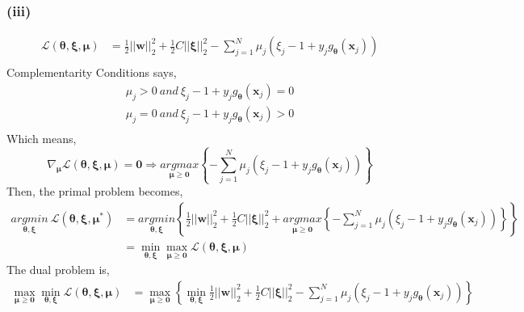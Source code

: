 \documentclass[11pt]{article}
\begin{document}
\subsubsection*{(iii)}
\begin{equation}
\begin{split}
\mathcal{L}(\pmb{\theta}, \pmb{\xi}, \pmb{\mu}) &= \frac{1}{2}||\pmb{w}||^2_2 + \frac{1}{2}C||\pmb{\xi}||^2_2 - \sum_{j=1}^{N}\mu_j(\xi_j-1+y_jg_{\pmb{\theta}}(\pmb{x}_j))\\
\end{split}
\end{equation}
Complementarity Conditions says,
\begin{equation}
\begin{split}
\mu_j > 0\ and\ \xi_j-1+y_jg_{\pmb{\theta}}(\pmb{x}_j) = 0\\
\mu_j = 0\ and\ \xi_j-1+y_jg_{\pmb{\theta}}(\pmb{x}_j) > 0\\
\end{split}
\end{equation} 
Which means,
\begin{equation}
\nabla_{\pmb{\mu}}\mathcal{L}(\pmb{\theta}, \pmb{\xi}, \pmb{\mu})=\pmb{0} \Rightarrow \underset{\pmb{\mu}\ge\pmb{0}}{argmax}\left\{- \sum_{j=1}^{N}\mu_j(\xi_j-1+y_jg_{\pmb{\theta}}(\pmb{x}_j))\right\}
\end{equation}
Then, the primal problem becomes,
\begin{equation}
\begin{split}
\underset{\pmb{\theta},\pmb{\xi}}{argmin}\ \mathcal{L}(\pmb{\theta}, \pmb{\xi}, \pmb{\mu}^*) &= \underset{\pmb{\theta},\pmb{\xi}}{argmin}\left\{ \frac{1}{2}||\pmb{w}||^2_2 + \frac{1}{2}C||\pmb{\xi}||^2_2 + \underset{\pmb{\mu}\ge\pmb{0}}{argmax}\left\{- \sum_{j=1}^{N}\mu_j(\xi_j-1+y_jg_{\pmb{\theta}}(\pmb{x}_j))\right\}\right\}\\
&=\min_{\pmb{\theta},\pmb{\xi}}\max_{\pmb{\mu}\ge\pmb{0}}\mathcal{L}(\pmb{\theta}, \pmb{\xi}, \pmb{\mu})
\end{split}
\end{equation}
The dual problem is,
\begin{equation}
\begin{split}
\max_{\pmb{\mu}\ge\pmb{0}}\min_{\pmb{\theta},\pmb{\xi}}\mathcal{L}(\pmb{\theta}, \pmb{\xi}, \pmb{\mu})&= \max_{\pmb{\mu}\ge\pmb{0}}\left\{\min_{\pmb{\theta},\pmb{\xi}}\frac{1}{2}||\pmb{w}||^2_2 + \frac{1}{2}C||\pmb{\xi}||^2_2 - \sum_{j=1}^{N}\mu_j(\xi_j-1+y_jg_{\pmb{\theta}}(\pmb{x}_j))\right\}
\end{split}
\end{equation}
\end{document}
